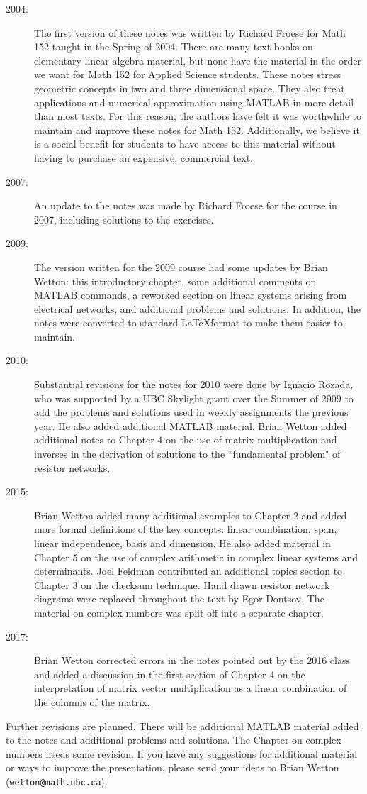 \begin{description}
\item[2004:] 
The first version of these notes was written by Richard Froese for
Math 152 taught in the Spring of 2004. There are many text books on
elementary linear algebra material, but none have the material in the
order we want for Math 152 for Applied Science students. These notes
stress geometric concepts in two and three dimensional space. They
also treat applications and numerical approximation using MATLAB in
more detail than most texts. For this reason, the authors have felt it
was worthwhile to maintain and improve these notes for Math
152. Additionally, we believe it is a social benefit for students to
have access to this material without having to purchase an expensive,
commercial text.
\item[2007:] 
An update to the notes was made by Richard Froese for the course in
2007, including solutions to the exercises. 
\item[2009:] The version written for
the 2009 course had some updates by Brian Wetton: this introductory
chapter, some additional comments on MATLAB commands, a reworked
section on linear systems arising from electrical networks, and
additional problems and solutions. In addition, the notes were 
converted to standard \LaTeX format to make them easier to maintain. 
\item[2010:] 
Substantial revisions for the notes for 2010 were done by Ignacio Rozada, who was supported 
by a UBC Skylight grant over the Summer of 2009 to add the problems 
and solutions used in weekly assignments the previous year. He also 
added additional MATLAB material. Brian Wetton added additional notes 
to Chapter 4 on the use of matrix multiplication and inverses in the 
derivation of solutions to the ``fundamental problem" of resistor 
networks.
\item[2015:] Brian Wetton added many additional examples to Chapter 2 and added more formal 
definitions of the key concepts: linear combination, span, linear independence, basis and dimension. He also added material in Chapter 5 on the use of complex arithmetic in complex linear systems and determinants. 
Joel Feldman contributed an additional topics section to Chapter 3 on the checksum technique. 
Hand drawn resistor network diagrams were replaced throughout the text by Egor Dontsov. The material on 
complex numbers was split off into a separate chapter.  
\item[2017:] Brian Wetton corrected errors in the notes pointed out by the 2016 class and added a discussion in the first section of Chapter 4 on the interpretation of matrix vector multiplication as a linear combination of the columns of the matrix. 
\end{description} 
Further revisions are planned. There will be additional MATLAB
material added to the notes and additional problems and solutions. The Chapter on complex numbers needs some revision. 
If you have any suggestions for additional
material or ways to improve the presentation, please send your ideas
to Brian Wetton ({\tt wetton@math.ubc.ca}).


% 
